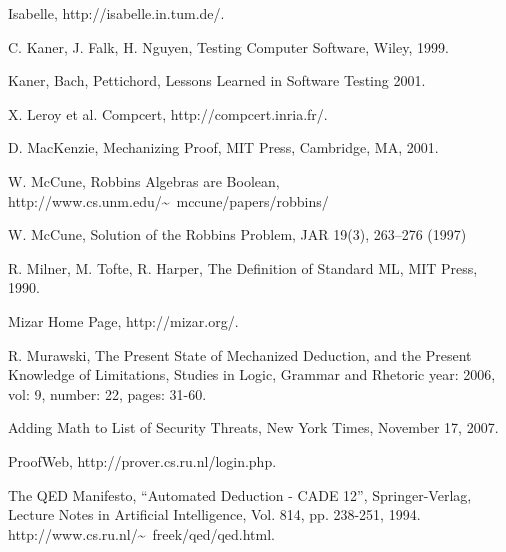 \documentclass{llncs}
\begin{document}
\begin{thebibliography}{A}
 Isabelle, http://isabelle.in.tum.de/.


 C. Kaner, J. Falk, H. Nguyen, Testing Computer
Software, Wiley, 1999.  

 Kaner, Bach, Pettichord,
Lessons Learned in Software Testing 2001.

 X. Leroy et al.  Compcert, http://compcert.inria.fr/.

 D. MacKenzie, Mechanizing Proof, MIT Press, Cambridge, MA,
2001.

 W. McCune, Robbins Algebras are Boolean, http://www.cs.unm.edu/\~~mccune/papers/robbins/

 W. McCune, Solution of the Robbins Problem, JAR 19(3), 263--276 (1997)

 R. Milner, M. Tofte, R. Harper, The Definition of Standard ML, MIT Press, 1990.

 Mizar Home Page, http://mizar.org/.

 R. Murawski, The Present State of Mechanized
Deduction, and the Present Knowledge of Limitations,
Studies in Logic, Grammar and Rhetoric 
year: 2006, vol: 9, number: 22, pages: 31-60.

 Adding Math to List of Security Threats, New York Times, November 17, 2007.


 ProofWeb, http://prover.cs.ru.nl/login.php.

 The QED Manifesto, ``Automated Deduction - CADE 12'', Springer-Verlag, Lecture Notes in Artificial Intelligence, Vol. 814, pp. 238-251, 1994.
http://www.cs.ru.nl/\~~freek/qed/qed.html.

\end{thebibliography}
\end{document}
